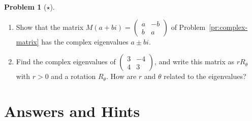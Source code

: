 \documentclass[11pt]{article}
\theoremstyle{definition}
\newtheorem{problem}{Problem}[section]
\begin{document}
\begin{problem}[$\star$]\label{pr:eig-complex}
    \begin{enumerate}[label=(\alph*)]
        \item Show that the matrix $M(a + bi) = \begin{pmatrix} a & -b \\ b & a \end{pmatrix}$ of Problem~\ref{pr:complex-matrix} has the complex eigenvalues $a \pm bi$.
        \item Find the complex eigenvalues of $\begin{pmatrix} 3 & -4 \\ 4 & 3 \end{pmatrix}$, and write this matrix as $r R_\theta$ with $r > 0$ and a rotation $R_\theta$. How are $r$ and $\theta$ related to the eigenvalues?
    \end{enumerate}
\end{problem}

\section*{Answers and Hints}
\end{document}
